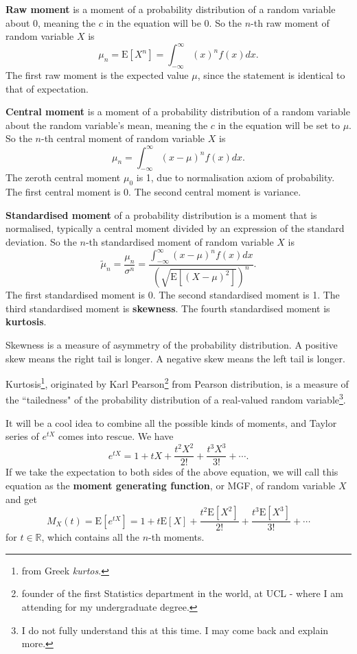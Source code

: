\documentclass[11pt, a4paper, oneside]{book}
\theoremstyle{definition}
\newcommand{\E}[1]{\text{E}[#1]}
\def\R{\mathbb{R}}
\begin{document}
\noindent \textbf{Raw moment} is a moment of a probability distribution of a random variable about 0, meaning the $c$ in the equation will be 0. So the $n$-th raw moment of random variable $X$ is\[
\mu_n = \E{X^n} = \int_{-\infty}^{\infty}(x)^nf(x) dx.
\]
The first raw moment is the expected value $\mu$, since the statement is identical to that of expectation. 

\noindent \textbf{Central moment} is a moment of a probability distribution of a random variable about the random variable's mean, meaning the $c$ in the equation will be set to $\mu$. So the $n$-th central moment of random variable $X$ is\[
\mu_n = \int_{-\infty}^{\infty}(x-\mu)^nf(x) dx.
\]
The zeroth central moment $\mu_0$ is 1, due to normalisation axiom of probability. The first central moment is 0. The second central moment is variance. 

\noindent \textbf{Standardised moment} of a probability distribution is a moment that is normalised, typically a central moment divided by an expression of the standard deviation. So the $n$-th standardised moment of random variable $X$ is\[
\tilde{\mu}_n = \frac{\mu_n}{\sigma^n} = \frac{\int_{-\infty}^{\infty}(x-\mu)^nf(x) dx}{(\sqrt{\E{(X-\mu)^2}})^n}.
\]
The first standardised moment is 0. The second standardised moment is 1. The third standardised moment is \textbf{skewness}. The fourth standardised moment is \textbf{kurtosis}.

\noindent Skewness is a measure of asymmetry of the probability distribution. A positive skew means the right tail is longer. A negative skew means the left tail is longer. 

\noindent Kurtosis\footnote{from Greek \emph{kurtos}.}, originated by Karl Pearson\footnote{founder of the first Statistics department in the world, at UCL - where I am attending for my undergraduate degree.} from Pearson distribution, is a measure of the ``tailedness" of the probability distribution of a real-valued random variable\footnote{I do not fully understand this at this time. I may come back and explain more.}. 
 
\noindent It will be a cool idea to combine all the possible kinds of moments, and Taylor series of $e^{tX}$ comes into rescue. We have\[
e^{tX} = 1 + tX + \frac{t^2 X^2}{2!} + \frac{t^3 X^3}{3!}+\cdots .
\]
If we take the expectation to both sides of the above equation, we will call this equation as the \textbf{moment generating function}, or MGF, of random variable $X$ and get\[
M_X(t) = \E{e^{tX}} = 1 + t\E{X} + \frac{t^2 \E{X^2}}{2!} + \frac{t^3 \E{X^3}}{3!}+\cdots
\]
for $t \in \R$, which contains all the $n$-th moments. 
\end{document}
